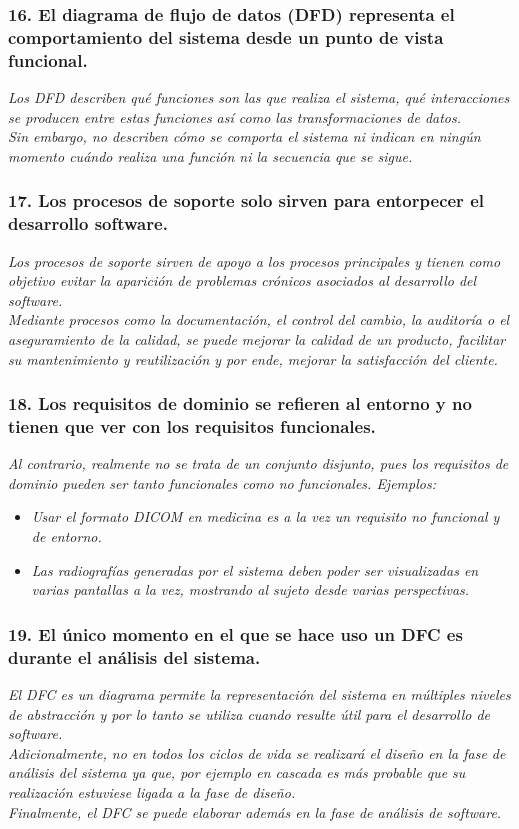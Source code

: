 \subsubsection*{16. El diagrama de flujo de datos (DFD) representa el comportamiento del sistema desde un punto de vista funcional.}
\textit{Los DFD describen qué funciones son las que realiza el sistema, qué interacciones se producen entre estas funciones así como las transformaciones de datos.
    \\
    Sin embargo, no describen cómo se comporta el sistema ni indican en ningún momento cuándo realiza una función ni la secuencia que se sigue.
}

\subsubsection*{17. Los procesos de soporte solo sirven para entorpecer el desarrollo software.}
\textit{Los procesos de soporte sirven de apoyo a los procesos principales y tienen como objetivo evitar la aparición de problemas crónicos asociados al desarrollo del software.\\
    Mediante procesos como la documentación, el control del cambio, la auditoría o el aseguramiento de la calidad, se puede mejorar la calidad de un producto, facilitar su mantenimiento y reutilización y por ende, mejorar la satisfacción del cliente.
}

\subsubsection*{18. Los requisitos de dominio se refieren al entorno y no tienen que ver con los requisitos funcionales.}
\textit{Al contrario, realmente no se trata de un conjunto disjunto, pues los requisitos de dominio pueden ser tanto funcionales como no funcionales. Ejemplos:
}
\begin{itemize}
    \item \textit{Usar el formato DICOM en medicina es a la vez un requisito no funcional y de entorno.}
    \item \textit{Las radiografías generadas por el sistema deben poder ser visualizadas en varias pantallas a la vez, mostrando al sujeto desde varias perspectivas. }
\end{itemize}


\subsubsection*{19. El único momento en el que se hace uso un DFC es durante el análisis del sistema.}
\textit{El DFC es un diagrama permite la representación del sistema en múltiples niveles de abstracción y por lo tanto se utiliza cuando resulte útil para el desarrollo de software.
    \\
    Adicionalmente, no en todos los ciclos de vida se realizará el diseño en la fase de análisis del sistema ya que, por ejemplo en cascada es más probable que su realización estuviese ligada a la fase de diseño.
    \\
    Finalmente, el DFC se puede elaborar además en la fase de análisis de software.
}

